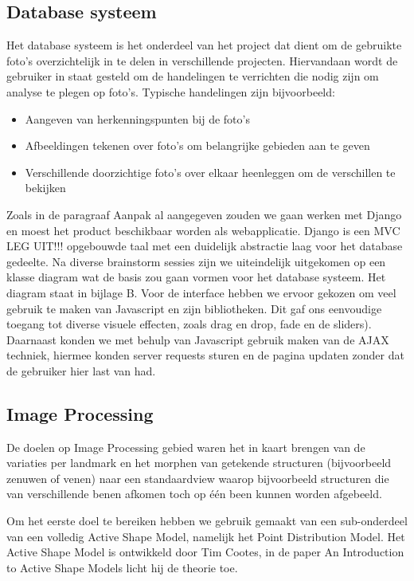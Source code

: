 \subsection{Database systeem}
Het database systeem is het onderdeel van het project dat dient om de gebruikte foto's overzichtelijk in te delen in verschillende projecten. Hiervandaan wordt de gebruiker in staat gesteld om de handelingen te verrichten die nodig zijn om analyse te plegen op  foto's. Typische handelingen zijn bijvoorbeeld: 

\begin{itemize}
\item Aangeven van herkenningspunten bij de foto's
\item Afbeeldingen tekenen over foto's om belangrijke gebieden aan te geven
\item Verschillende doorzichtige foto's over elkaar heenleggen om de verschillen te bekijken
\end{itemize}

Zoals in de paragraaf Aanpak al aangegeven zouden we gaan werken met Django en moest het product beschikbaar worden als webapplicatie. Django is een MVC LEG UIT!!! opgebouwde taal met een duidelijk abstractie laag voor het database gedeelte. Na diverse brainstorm sessies zijn we uiteindelijk uitgekomen op een klasse diagram wat de basis zou gaan vormen voor het database systeem. Het diagram staat in bijlage B.
Voor de interface hebben we ervoor gekozen om veel gebruik te maken van Javascript en zijn bibliotheken. Dit gaf ons eenvoudige toegang tot diverse visuele effecten, zoals drag en drop, fade en de sliders). Daarnaast konden we met behulp van Javascript gebruik maken van de AJAX techniek, hiermee konden server requests sturen en de pagina updaten zonder dat de gebruiker hier last van had.

\subsection{Image Processing}
De doelen op Image Processing gebied waren het in kaart brengen van de variaties per landmark en het morphen van getekende structuren (bijvoorbeeld zenuwen of venen) naar een standaardview waarop bijvoorbeeld structuren die van verschillende benen afkomen toch op \'{e}\'{e}n been kunnen worden afgebeeld.

Om het eerste doel te bereiken hebben we gebruik gemaakt van een sub-onderdeel van een volledig Active Shape Model, namelijk het Point Distribution Model. Het Active Shape Model is ontwikkeld door Tim Cootes, in de paper An Introduction to Active Shape Models licht hij de theorie toe.\cite{introASM}

